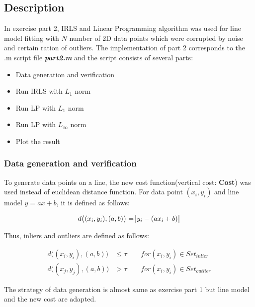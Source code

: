 \documentclass[paper=a4, fontsize=11pt]{scrartcl} %
\numberwithin{equation}{section} %
\numberwithin{figure}{section} %
\numberwithin{table}{section} %
\newcommand{\filename}[1]{\textbf{\textit{#1}}}
\newcommand{\funcname}[1]{\textbf{#1}}
\begin{document}
\subsection{Description}

In exercise part 2, IRLS and Linear Programming algorithm was used for line model fitting with $N$ number of 2D data points which were corrupted by noise and certain ration of outliers. The implementation of part 2 corresponds to the .m script file \filename{part2.m} and the script consists of several parts: 

\begin{itemize}
\item Data generation and verification
\item Run IRLS with $L_{1}$ norm
\item Run LP with $L_{1}$ norm 
\item Run LP with $L_{\infty}$ norm 
\item Plot the result
\end{itemize}  

\subsubsection{Data generation and verification}

To generate data points on a line, the new cost function(vertical cost: \funcname{Cost}) was used instead of euclidean distance function. For data point $(x_{i}, y_{i})$ and line model $y = ax + b$, it is defined as follows:

\begin{equation*}
d\big((x_{i}, y_{i}), (a, b)\big) = \abs{y_{i} - (ax_{i} + b)}
\end{equation*}

Thus, inliers and outliers are defined as  follows:

\begin{align*}
d \big( (x_{i}, y_{i}), (a, b) \big) &\leq \tau  \qquad for (x_{i}, y_{i}) \in Set_{inlier} \\
d \big( (x_{j}, y_{j}), (a, b) \big) &> \tau \qquad for (x_{i}, y_{i}) \in Set_{outlier} 
\end{align*}

The strategy of data generation is almost same as exercise part 1 but line model and the new cost are adapted.

\end{document}
